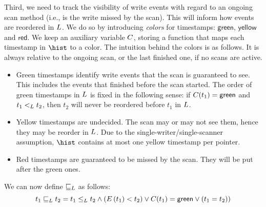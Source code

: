 Third, we need to track the visibility of write events with regard to
an ongoing scan method (i.e., is the write missed by the scan). This
will inform how events are reordered in $L$. We do so by
introducing \emph{colors} for timestamps: $\mathsf{green}$,
$\mathsf{yellow}$ and $\mathsf{red}$. We keep an auxiliary variable
$C$, storing a function that maps each timestamp in $\hist$ to a
color.
%
The intuition behind the colors is as follows. It is always relative
to the ongoing scan, or the last finished one, if no scans are active.
%
\begin{itemize}
\item Green timestamps identify write events that the scan is
  guaranteed to see. This includes the events that finished before the
  scan started. The order of green timestamps in $L$ is fixed
  in the following sense: if $C(t_1) = \mathsf{green}$ and
  $t_1 \mathrel{<_L} t_2$, then $t_2$ will never be reordered before $t_1$ in
  $L$.

\item Yellow timestamps are undecided. The scan may or may not see
  them, hence they may be reorder in $L$. Due to the
  single-writer/single-scanner assumption, $\hist$ contains at most
  one yellow timestamp per pointer.

\item Red timestamps are guaranteed to be missed by the scan. They
  will be put after the green ones.
\end{itemize}



We can now define $\mathrel{\sqsubseteq_L}$ as follows:
\begin{equation}
 t_1 \mathrel{\sqsubseteq_L} t_2 = t_1\mathrel{\leq_L} t_2 \wedge ( E\,(t_1) < t_2) \vee C(t_1) =
 \mathsf{green} \vee (t_1 = t_2) ) \label{def-jleq}
\end{equation}

  
